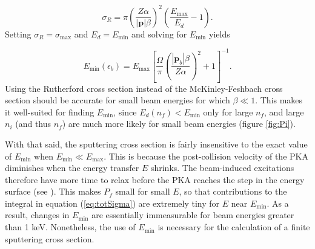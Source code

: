 \documentclass{article}
\begin{document}
\begin{equation}
  \sigma_R
  =
  \pi\left(\frac{Z\alpha}{|\mathbf{p}|\beta}\right)^2
  \left(\frac{E_\text{max}}{E_d} - 1\right).
  \label{eq:Rutherford}
\end{equation}
%
Setting $\sigma_R=\sigma_\text{max}$ and $E_d=E_\text{min}$ and solving for
$E_\text{min}$ yields

\begin{equation}
  E_\text{min}(\epsilon_b)
  =
  E_\text{max}
  \left[\frac{\Omega}{\pi}
    \left(\frac{|\mathbf{p}_b|\beta}{Z\alpha}\right)^2 + 1
  \right]^{-1}.
  \label{eq:Emin}
\end{equation}
%
Using the Rutherford cross section instead of the McKinley-Feshbach
cross section should be accurate for small beam energies for which $\beta\ll
1$.
This makes it well-suited for finding $E_\text{min}$, since
$E_d(n_f)<E_\text{min}$ only for large $n_f$, and large $n_i$ (and thus $n_f$)
are much more likely for small beam energies (figure \ref{fig:Pi}).

With that said, the sputtering cross section is fairly insensitive to the exact
value of $E_\text{min}$ when $E_\text{min} \ll E_\text{max}$.
This is because the post-collision velocity of the PKA diminishes when the
energy transfer $E$ shrinks.
The beam-induced excitations therefore have more time to relax before the PKA
reaches the step in the energy surface (see
\textit{}).
This makes $P_f$ small for small $E$, so that contributions to the integral in
equation (\ref{eq:totSigma}) are extremely tiny for $E$ near $E_\text{min}$.
As a result, changes in $E_\text{min}$ are essentially immeasurable for beam
energies greater than 1 keV.
Nonetheless, the use of $E_\text{min}$ is necessary for the calculation of a
finite sputtering cross section.




\end{document}
